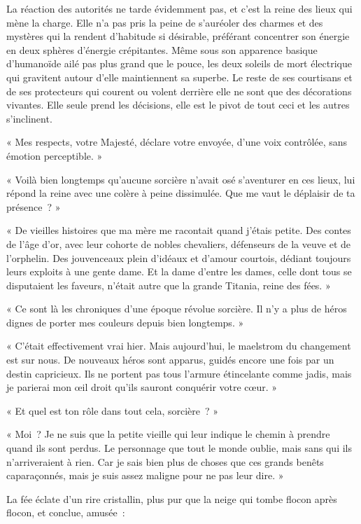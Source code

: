 \documentclass{report}
\begin{document}
La réaction des autorités ne tarde évidemment pas, et c'est la reine des lieux qui mène la charge. Elle n'a pas pris la peine de s'auréoler des charmes et des mystères qui la rendent d'habitude si désirable, préférant concentrer son énergie en deux sphères d'énergie crépitantes. Même sous son apparence basique d'humanoïde ailé pas plus grand que le pouce, les deux soleils de mort électrique qui gravitent autour d'elle maintiennent sa superbe. Le reste de ses courtisans et de ses protecteurs qui courent ou volent derrière elle ne sont que des décorations vivantes. Elle seule prend les décisions, elle est le pivot de tout ceci et les autres s'inclinent.

« Mes respects, votre Majesté, déclare votre envoyée, d'une voix contrôlée, sans émotion perceptible. »

« Voilà bien longtemps qu'aucune sorcière n'avait osé s'aventurer en ces lieux, lui répond la reine avec une colère à peine dissimulée. Que me vaut le déplaisir de ta présence ? »

« De vieilles histoires que  ma mère me racontait quand j'étais petite. Des contes de l'âge d'or, avec leur cohorte de nobles chevaliers, défenseurs de la veuve et de l'orphelin. Des jouvenceaux plein d'idéaux et d'amour courtois, dédiant toujours leurs exploits à une gente dame. Et la dame d'entre les dames, celle dont tous se disputaient les faveurs, n'était autre que la grande Titania, reine des fées. »

« Ce sont là les chroniques d'une époque révolue sorcière. Il n'y a plus de héros dignes de porter mes couleurs depuis bien longtemps. »

« C'était effectivement vrai hier. Mais aujourd'hui, le maelstrom du changement est sur nous. De nouveaux héros sont apparus, guidés encore une fois par un destin capricieux. Ils ne portent pas tous l'armure étincelante comme jadis, mais je parierai mon œil droit qu'ils sauront conquérir votre cœur. »

« Et quel est ton rôle dans tout cela, sorcière ? »

« Moi ? Je ne suis que la petite vieille qui leur indique le chemin à prendre quand ils sont perdus. Le personnage que tout le monde oublie, mais sans qui ils n'arriveraient à rien. Car je sais bien plus de choses que ces grands benêts caparaçonnés, mais je suis assez maligne pour ne pas leur dire. »

La fée éclate d'un rire cristallin, plus pur que la neige qui tombe flocon après flocon, et conclue, amusée :
\end{document}
